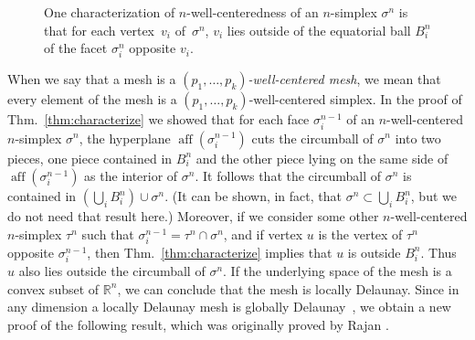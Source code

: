 \documentclass[final]{siamltex}
\newcommand{\Real}{\ensuremath{\mathbb{R}}} \newcommand{\meshM}{\ensuremath{\mathcal{M}}} \newcommand{\meshV}{\ensuremath{\mathcal{V}}} \newcommand{\meshT}{\ensuremath{\mathcal{T}}} \newcommand{\interior}{\ensuremath{\mathrm{Int}}}
\DeclareMathOperator{\aff}{aff}
\begin{document}
\begin{figure}
  \centering
  \caption{One characterization of $n$-well-centeredness of an
    $n$-simplex $\sigma^{n}$ is that for each vertex~$v_{i}$
    of~$\sigma^{n}$, $v_{i}$ lies outside of the equatorial ball
    $B^{n}_{i}$ of the facet $\sigma^{n}_{i}$ opposite $v_{i}$.}
\label{fig:eqballsxmpl}
\end{figure}

When we say that a mesh is a {\emph{$(p_1,\ldots,p_k)$-well-centered
    mesh}}, we mean that every element of the mesh is a
$(p_{1},\ldots,p_{k})$-well-centered simplex.  In the proof of
Thm.~\ref{thm:characterize} we showed that for each face
$\sigma^{n-1}_{i}$ of an $n$-well-centered $n$-simplex $\sigma^{n}$,
the hyperplane $\aff(\sigma^{n-1}_{i})$ cuts the circumball of
$\sigma^{n}$ into two pieces, one piece contained in $B^{n}_{i}$ and
the other piece lying on the same side of $\aff(\sigma^{n-1}_{i})$ as
the interior of $\sigma^{n}$.  It follows that the circumball of
$\sigma^{n}$ is contained in $\left(\bigcup_{i} B^{n}_{i}\right) \cup
\sigma^{n}$.  (It can be shown, in fact, that $\sigma^{n} \subset
\bigcup_{i} B^{n}_{i}$, but we do not need that result here.)
Moreover, if we consider some other $n$-well-centered
  $n$-simplex $\tau^{n}$ such that $\sigma^{n-1}_{i} = \tau^{n}
  \cap \sigma^{n}$, and if vertex $u$ is the vertex of
$\tau^{n}$ opposite $\sigma^{n-1}_{i}$, then
Thm.~\ref{thm:characterize} implies that $u$ is outside $B^{n}_{i}$.
Thus $u$ also lies outside the circumball of $\sigma^{n}$.  If the
underlying space of the mesh is a convex subset of $\Real^{n}$, we can
conclude that the mesh is locally Delaunay.  Since in any dimension a
locally Delaunay mesh is globally Delaunay~\cite{EdSh1996}, we obtain
a new proof of the following result, which was originally proved by
Rajan \cite{Rajan1994}.
\end{document}
